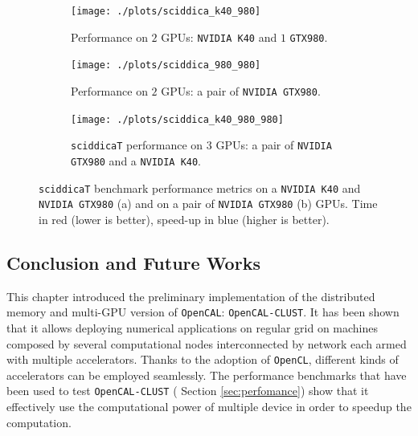 \begin{figure}
	\vspace{-0.5cm}
	\begin{subfigure}{1.0\textwidth}
	
		\texttt{[image: ./plots/sciddica\_k40\_980]}
			\caption{Performance on $2$ GPUs: \texttt{NVIDIA K40} and $1$ \texttt{GTX980}.}
		\label{fig:sciddica_k40_980}
	\end{subfigure}        
	\endminipage \hfill

	\begin{subfigure}{1.0\textwidth}
		\texttt{[image: ./plots/sciddica\_980\_980]}
		\caption{Performance on $2$ GPUs: a pair of \texttt{NVIDIA GTX980}.}
		\label{fig:sciddica_980_980}
	\end{subfigure}
	\endminipage\hfill
	\begin{subfigure}{1.0\textwidth}
		\texttt{[image: ./plots/sciddica\_k40\_980\_980]}
		\caption[\texttt{sciddicaT} performance on $3$ GPUs.]{\texttt{sciddicaT} performance on $3$ GPUs: a pair of \texttt{NVIDIA GTX980} and a \texttt{NVIDIA K40}.}
		\label{fig:sciddica_k40_980_980}
	\end{subfigure}
	\endminipage\hfill
	
	\caption[\texttt{sciddicaT} benchmark performance metrics.]{\texttt{sciddicaT} benchmark performance metrics on a \texttt{NVIDIA K40} and \texttt{NVIDIA GTX980} (a) and on  a pair of \texttt{NVIDIA GTX980} (b) GPUs. Time in red (lower is better), speed-up in blue (higher is better).}
	\label{fig:sciddica_performance}
\end{figure}

\subsection{Conclusion and Future Works}
This chapter introduced the preliminary implementation of the distributed memory and multi-GPU  version of \texttt{OpenCAL}: \texttt{OpenCAL-CLUST}.
It has been shown that it allows deploying numerical applications on regular grid on machines composed by several computational nodes interconnected by network each armed with multiple accelerators. Thanks to the adoption of \texttt{OpenCL}, different kinds of accelerators can be employed seamlessly.
The performance benchmarks that have been used to test \texttt{OpenCAL-CLUST} ( Section \ref{sec:perfomance}) show that it effectively use the computational power of multiple device in order to speedup the computation.

